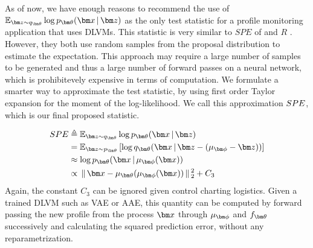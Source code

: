 \documentclass{scrartcl}
\theoremstyle{definition}
\begin{document}
As of now, we have enough reasons to recommend the use of $\E_{\mbz \sim q_{\mbtheta}} \log \decoding$ as the only test statistic for a profile monitoring application that uses DLVMs.
This statistic is very similar to $SPE$ of \parencite{lee2019process} and $R$ \parencite{wang2019systematic}.
However, they both use random samples from the proposal distribution to estimate the expectation.
This approach may require a large number of samples to be generated and thus a large number of forward passes on a neural network, which is prohibitevely expensive in terms of computation.
We formulate a smarter way to approximate the test statistic, by using first order Taylor expansion for the moment of the log-likelihood.
We call this approximation $SPE$, which is our final proposed statistic.

\begin{align}
    \label{eqn:propstat:final}
    \oursacronym &\triangleq \E_{\mbz \sim q_{\mbtheta}} \log \decoding \\
    &= \E_{\mbz \sim p_{\mbtheta}} \left[ \log q_{\mbtheta}(\mbx \g \mbz - (\mu_{\mbphi} - \mbz)) \right] \\
    &\approx \log\ptheta(\mbx \g \mu_{\mbphi}(\mbx)) \\ 
    &\propto \gg \mbx - \mu_{\mbtheta}(\mu_{\mbphi}(\mbx)) \gg_2^{2} + C_{3}
\end{align}
Again, the constant $C_3$ can be ignored given control charting logistics. Given a trained DLVM such as VAE or AAE, this quantity can be computed by forward passing the new profile from the process $\mbx$ through $\mu_{\mbphi}$ and $f_{\mbtheta}$ successively and calculating the squared prediction error, without any reparametrization.
\end{document}
